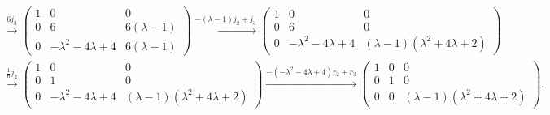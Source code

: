 \documentclass[../../main.tex]{subfiles}%
\begin{document}
\begin{solution}
\begin{align*}
&\xrightarrow{6j_3}
\begin{pmatrix}
1 & 0 & 0 \\
0 & 6 & 6(\lambda - 1) \\
0 & -\lambda^2 - 4\lambda + 4 & 6(\lambda - 1)
\end{pmatrix}
\xrightarrow{-(\lambda-1)j_2+j_3}
\begin{pmatrix}
1 & 0 & 0 \\
0 & 6 & 0 \\
0 & -\lambda^2 - 4\lambda + 4 & (\lambda - 1)(\lambda^2 + 4\lambda + 2)
\end{pmatrix}\\
&\xrightarrow{\frac{1}{6}j_2}
\begin{pmatrix}
1 & 0 & 0 \\
0 & 1 & 0 \\
0 & -\lambda^2 - 4\lambda + 4 & (\lambda - 1)(\lambda^2 + 4\lambda + 2)
\end{pmatrix}
\xrightarrow{-(-\lambda^2 - 4\lambda + 4)r_2+r_3}
\begin{pmatrix}
1 & 0 & 0 \\
0 & 1 & 0 \\
0 & 0 & (\lambda - 1)(\lambda^2 + 4\lambda + 2)
\end{pmatrix}.
\end{align*} 

\end{solution}
\end{document}
